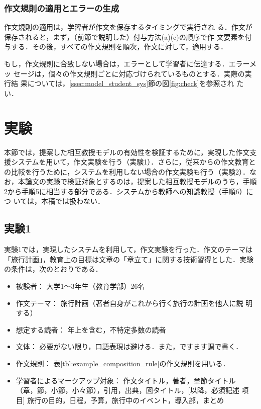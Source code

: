\documentclass[japanese]{jnlp_1.4}
\begin{document}
\subsubsection{作文規則の適用とエラーの生成}

作文規則の適用は，学習者が作文を保存するタイミングで実行され
る．作文が保存されると，まず，（前節で説明した）付与方法(a)(c)の順序で作
文要素を付与する．その後，すべての作文規則を順次，作文に対して，適用する．

もし，作文規則に合致しない場合は，エラーとして学習者に伝達する．エラーメッ
セージは，個々の作文規則ごとに対応づけられているものとする．実際の実行結
果については，\ref{ssec:model_student_sys}節の図\ref{fig:check}を参照され
たい．


\section{実験}\label{sec:experiment}

本節では，提案した相互教授モデルの有効性を検証するために，実現した作文支
援システムを用いて，作文実験を行う（実験1）．さらに，従来からの作文教育と
の比較を行うために，システムを利用しない場合の作文実験も行う（実験2）．な
お，本論文の実験で検証対象とするのは，提案した相互教授モデルのうち，手順
2から手順5に相当する部分である．システムから教師への知識教授（手順6）につ
いては，本稿では扱わない．

\subsection{実験1}

実験1では，実現したシステムを利用して，作文実験を行った．作文のテーマは
「旅行計画」，教育上の目標は文章の「章立て」に関する技術習得とした．実験
の条件は，次のとおりである．

\begin{itemize}
 \item 被験者： 大学1〜3年生（教育学部）26名
 \item 作文テーマ： 旅行計画（著者自身がこれから行く旅行の計画を他人に説
       明する）
 \item 想定する読者： 年上を含む，不特定多数の読者
 \item 文体： 必要がない限り，口語表現は避ける．また，ですます調で書く．
 \item 作文規則： 表\ref{tbl:example_composition_rule}の作文規則を用いる．
 \item 学習者によるマークアップ対象： 作文タイトル，著者，章節タイトル
       （章，節，小節，小々節），引用，出典，図タイトル，[以降，必須記述
       項目] 旅行の目的，日程，予算，旅行中のイベント，導入部，まとめ
\end{itemize}
\end{document}
